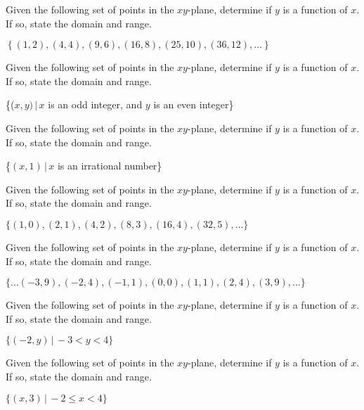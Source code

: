 \documentclass{ximera}
\begin{document}
\begin{problem}
  Given the following set of points in the $xy$-plane, determine if $y$ is a function of $x$.  If so, state the domain and range.  

$\left\{ (1,2), (4,4), (9,6), (16,8), (25,10), (36, 12), \ldots \right\}$
\end{problem}    

\begin{problem}
  Given the following set of points in the $xy$-plane, determine if $y$ is a function of $x$.  If so, state the domain and range.  

\{($x, y) \, | \, x$ is an odd integer, and $y$ is an even integer\}
\end{problem}   

\begin{problem}
  Given the following set of points in the $xy$-plane, determine if $y$ is a function of $x$.  If so, state the domain and range.  

\{$(x, 1) \, | \, x$ is an irrational number\}
\end{problem}   

\begin{problem}
  Given the following set of points in the $xy$-plane, determine if $y$ is a function of $x$.  If so, state the domain and range.  

$\{ (1,0), (2,1), (4,2), (8,3), (16,4), (32, 5), \ldots \}$
\end{problem}   

\begin{problem}
  Given the following set of points in the $xy$-plane, determine if $y$ is a function of $x$.  If so, state the domain and range.  

$\{ \ldots (-3,9), (-2,4), (-1,1), (0,0), (1,1), (2,4), (3,9), \ldots \}$
\end{problem}   





\begin{problem}
  Given the following set of points in the $xy$-plane, determine if $y$ is a function of $x$.  If so, state the domain and range.  

$\{ (-2, y) \, | \, -3 < y < 4\}$
\end{problem}   

\begin{problem}
  Given the following set of points in the $xy$-plane, determine if $y$ is a function of $x$.  If so, state the domain and range.  

$\{ (x,3) \, | \,  -2 \leq x < 4\}$
\end{problem}    
\end{document}
